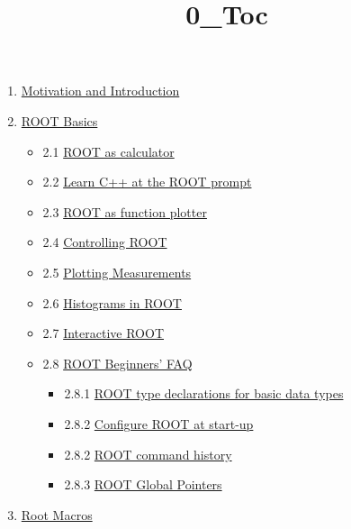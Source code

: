 \documentclass{article}
\title{0\_Toc}
\providecommand{\tightlist}{%
      \setlength{\itemsep}{0pt}\setlength{\parskip}{0pt}}
\begin{document}
    
    
    \maketitle
    
    

    
    \begin{enumerate}
\def\labelenumi{\arabic{enumi}.}
\tightlist
\item
  \href{/1-Motivation-and-Introduction.html}{Motivation and
  Introduction}
\item
  \href{/2-ROOT-Basics.html}{ROOT Basics}

  \begin{itemize}
  \tightlist
  \item
    2.1 \href{/2-ROOT-Basics.html\#2.1-ROOT-as-calculator}{ROOT as
    calculator}
  \item
    2.2
    \href{/2-ROOT-Basics.html\#2.2-Learn-C++-at-the-ROOT-prompt}{Learn
    C++ at the ROOT prompt}
  \item
    2.3
    \href{/notebooks/notebooks/2-ROOT-Basics.html\#2.3-ROOT-as-function-plotter}{ROOT
    as function plotter}
  \item
    2.4 \href{/2-ROOT-Basics.html\#2.4Controlling-ROOT}{Controlling
    ROOT}
  \item
    2.5 \href{/2-ROOT-Basics.html\#2.5-Plotting-Measurements}{Plotting
    Measurements}
  \item
    2.6 \href{/2-ROOT-Basics.html\#2.6-Histograms-in-ROOT}{Histograms in
    ROOT}
  \item
    2.7 \href{/2-ROOT-Basics.html\#2.7-Interactive-ROOT}{Interactive
    ROOT}
  \item
    2.8 \href{/2-ROOT-Basics.html\#2.8-ROOT-Beginners’-FAQ}{ROOT
    Beginners' FAQ}

    \begin{itemize}
    \tightlist
    \item
      2.8.1
      \href{/2-ROOT-Basics.html\#2.8.1-ROOT-type-declarations-for-basic-data-types}{ROOT
      type declarations for basic data types}
    \item
      2.8.2
      \href{/2-ROOT-Basics.html\#2.8.2-Configure-ROOT-at-start-up}{Configure
      ROOT at start-up}
    \item
      2.8.2 \href{/2-ROOT-Basics.html\#2.8.3-ROOT-command-history}{ROOT
      command history}
    \item
      2.8.3 \href{/2-ROOT-Basics.html\#2.8.4-ROOT-Global-Pointers}{ROOT
      Global Pointers}
    \end{itemize}
  \end{itemize}
\item
  \href{/3-ROOT-Macros.html}{Root Macros}


\end{enumerate}
\end{document}
